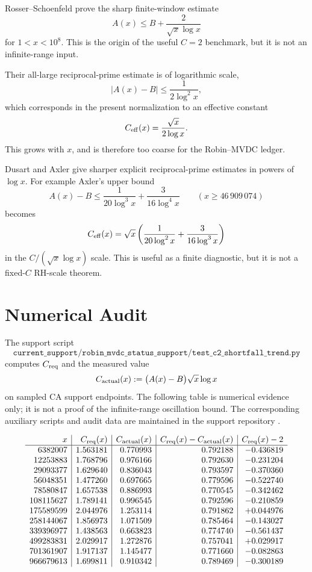 \documentclass[11pt,a4paper]{article}
\begin{document}
Rosser--Schoenfeld \cite{rosser1962} prove the sharp finite-window
estimate
\[
  A(x)\le B+\frac{2}{\sqrt{x}\log x}
\]
for \(1<x<10^8\). This is the origin of the useful \(C=2\) benchmark, but it is
not an infinite-range input.

Their all-large reciprocal-prime estimate is of logarithmic scale,
\[
  |A(x)-B|\le \frac{1}{2\log^2 x},
\]
which corresponds in the present normalization to an effective constant
\[
  C_{\rm eff}(x)=\frac{\sqrt{x}}{2\log x}.
\]
This grows with \(x\), and is therefore too coarse for the Robin--MVDC ledger.

Dusart \cite{dusart2018} and Axler \cite{axler2018} give sharper explicit
reciprocal-prime estimates in powers of \(\log x\). For example Axler's upper
bound
\[
  A(x)-B
  \le
  \frac{1}{20\log^3 x}
  +
  \frac{3}{16\log^4 x}
  \qquad (x\ge 46\,909\,074)
\]
becomes
\[
  C_{\rm eff}(x)
  =
  \sqrt{x}
  \left(
    \frac{1}{20\log^2 x}
    +
    \frac{3}{16\log^3 x}
  \right)
\]
in the \(C/(\sqrt{x}\log x)\) scale. This is useful as a finite diagnostic, but
it is not a fixed-\(C\) RH-scale theorem.

\section{Numerical Audit}

The support script
\[
  \texttt{current\_support/robin\_mvdc\_status\_support/}
  \texttt{test\_c2\_shortfall\_trend.py}
\]
computes \(C_{\rm req}\) and the measured value
\[
  C_{\rm actual}(x):=\bigl(A(x)-B\bigr)\sqrt{x}\log x
\]
on sampled CA support endpoints. The following table is numerical evidence
only; it is not a proof of the infinite-range oscillation bound. The
corresponding auxiliary scripts and audit data are maintained in the support
repository \cite{polakriemannrepo2026}.

\[
\begin{array}{r|r|r|r|r}
x & C_{\rm req}(x) & C_{\rm actual}(x) &
C_{\rm req}(x)-C_{\rm actual}(x) & C_{\rm req}(x)-2\\
\hline
6382007   & 1.563181 & 0.770993 & 0.792188 & -0.436819\\
12253883  & 1.768796 & 0.976166 & 0.792630 & -0.231204\\
29093377  & 1.629640 & 0.836043 & 0.793597 & -0.370360\\
56048351  & 1.477260 & 0.697665 & 0.779596 & -0.522740\\
78580847  & 1.657538 & 0.886993 & 0.770545 & -0.342462\\
108115627 & 1.789141 & 0.996545 & 0.792596 & -0.210859\\
175589599 & 2.044976 & 1.253114 & 0.791862 & +0.044976\\
258144067 & 1.856973 & 1.071509 & 0.785464 & -0.143027\\
339396977 & 1.438563 & 0.663823 & 0.774740 & -0.561437\\
499283831 & 2.029917 & 1.272876 & 0.757041 & +0.029917\\
701361907 & 1.917137 & 1.145477 & 0.771660 & -0.082863\\
966679613 & 1.699811 & 0.910342 & 0.789469 & -0.300189
\end{array}
\]
\end{document}
